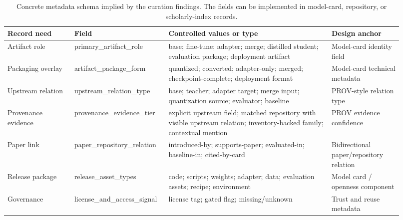 \begin{table}[t]
\centering
\caption{Concrete metadata schema implied by the curation findings. The fields can be implemented in model-card, repository, or scholarly-index records.}
\label{tab:metadata-schema}
\small
\begin{tabular}{p{0.16\linewidth}p{0.20\linewidth}p{0.39\linewidth}p{0.17\linewidth}}
\toprule
Record need & Field & Controlled values or type & Design anchor \\
\midrule
Artifact role & primary\_artifact\_role & base; fine-tune; adapter; merge; distilled student; evaluation package; deployment artifact & Model-card identity field \\
Packaging overlay & artifact\_package\_form & quantized; converted; adapter-only; merged; checkpoint-complete; deployment format & Model-card technical metadata \\
Upstream relation & upstream\_relation\_type & base; teacher; adapter target; merge input; quantization source; evaluator; baseline & PROV-style relation type \\
Provenance evidence & provenance\_evidence\_tier & explicit upstream field; matched repository with visible upstream relation; inventory-backed family; contextual mention & PROV evidence confidence \\
Paper link & paper\_repository\_relation & introduced-by; supports-paper; evaluated-in; baseline-in; cited-by-card & Bidirectional paper/repository relation \\
Release package & release\_asset\_types & code; scripts; weights; adapter; data; evaluation assets; recipe; environment & Model card / openness component \\
Governance & license\_and\_access\_signal & license tag; gated flag; missing/unknown & Trust and reuse metadata \\
\bottomrule
\end{tabular}
\end{table}
